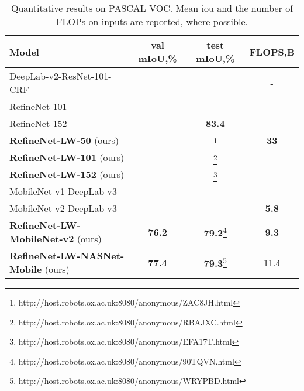 \documentclass{bmvc2k}
\begin{document}
\begin{table}
	\begin{center}
		\begin{tabular}{l|c|c|c}
			\hline Model & val mIoU,\% & test mIoU,\% & FLOPS,B\\
\hline
DeepLab-v2-ResNet-101-CRF~\cite{ChenPK0Y16} &  &  & -\\
			RefineNet-101~\cite{LinMSR17} & - &  & \\
			RefineNet-152~\cite{LinMSR17} & -  & \textbf{83.4} & \\
			\textbf{RefineNet-LW-50} (ours) &  & \footnote{http://host.robots.ox.ac.uk:8080/anonymous/ZAC8JH.html} & \textbf{33}\\
			\textbf{RefineNet-LW-101} (ours) &  & \footnote{http://host.robots.ox.ac.uk:8080/anonymous/RBAJXC.html} & \\
			\textbf{RefineNet-LW-152} (ours) &  & \footnote{http://host.robots.ox.ac.uk:8080/anonymous/EFA17T.html} & \\
			\hline
			MobileNet-v1-DeepLab-v3~\cite{abs-1801-04381}  &  & - & \\
			MobileNet-v2-DeepLab-v3~\cite{abs-1801-04381}  &  & - & \textbf{5.8}\\
			\textbf{RefineNet-LW-MobileNet-v2} (ours) & \textbf{76.2} & \textbf{79.2}\footnote{http://host.robots.ox.ac.uk:8080/anonymous/90TQVN.html} & \textbf{9.3}\\
			\textbf{RefineNet-LW-NASNet-Mobile} (ours) & \textbf{77.4} & \textbf{79.3}\footnote{http://host.robots.ox.ac.uk:8080/anonymous/WRYPBD.html} & 11.4\\
			\hline
		\end{tabular}
	\end{center}
	\caption{Quantitative results on PASCAL VOC. Mean iou and the number of FLOPs on  inputs are reported, where possible.\label{table:voc}}
	\vskip -0.15in
\end{table}
\end{document}

